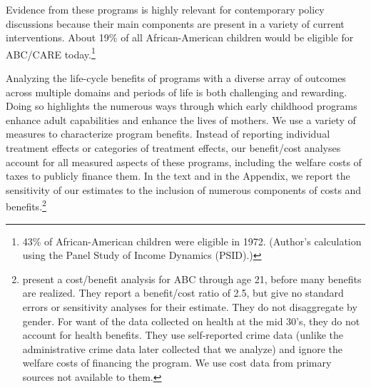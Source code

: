 Evidence from these programs is highly relevant for contemporary policy discussions because their main components are present in a variety of current interventions. About 19\% of all African-American children would be eligible for ABC/CARE today.\footnote{43\% of African-American children were eligible in 1972. (Author's calculation using the Panel Study of Income Dynamics (PSID).)}

Analyzing the life-cycle benefits of programs with a diverse array of outcomes across multiple domains and periods of life is both challenging and rewarding. Doing so highlights the numerous ways through which early childhood programs enhance adult capabilities and enhance the lives of mothers. We use a variety of measures to characterize program benefits. Instead of reporting individual treatment effects or categories of treatment effects, our benefit/cost analyses account for all measured aspects of these programs, including the welfare costs of taxes to publicly finance them. In the text and in the  Appendix, we report the sensitivity of our estimates to the inclusion of numerous components of costs and benefits.\footnote{\cite{Barnett_Masse_2002_benefitcost,Barnett_Masse_2007_EER} present a cost/benefit analysis for ABC through age 21, before many benefits are realized. They report a benefit/cost ratio of 2.5, but give no standard errors or sensitivity analyses for their estimate. They do not disaggregate by gender. For want of the data collected on health at the mid 30's, they do not account for health benefits. They use self-reported crime data (unlike the administrative crime data later collected that we analyze) and ignore the welfare costs of financing the program. We use cost data from primary sources not available to them.}

